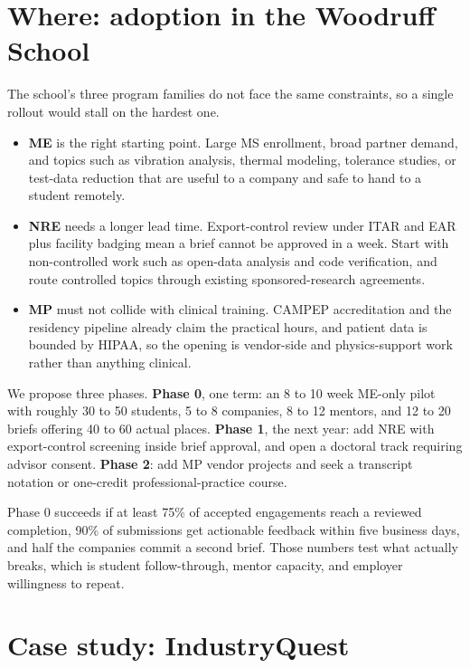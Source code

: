\documentclass[10pt,letterpaper]{article}
\begin{document}
\section{Where: adoption in the Woodruff School}

The school's three program families do not face the same constraints, so a single rollout would stall
on the hardest one.

\begin{itemize}
  \item \textbf{ME} is the right starting point. Large MS enrollment, broad partner demand, and topics
        such as vibration analysis, thermal modeling, tolerance studies, or test-data reduction that are
        useful to a company and safe to hand to a student remotely.
  \item \textbf{NRE} needs a longer lead time. Export-control review under ITAR and EAR plus facility
        badging mean a brief cannot be approved in a week. Start with non-controlled work such as
        open-data analysis and code verification, and route controlled topics through existing
        sponsored-research agreements.
  \item \textbf{MP} must not collide with clinical training. CAMPEP accreditation and the residency
        pipeline already claim the practical hours, and patient data is bounded by HIPAA, so the opening
        is vendor-side and physics-support work rather than anything clinical.
\end{itemize}

We propose three phases. \textbf{Phase 0}, one term: an 8 to 10 week ME-only pilot with roughly 30 to
50 students, 5 to 8 companies, 8 to 12 mentors, and 12 to 20 briefs offering 40 to 60 actual places.
\textbf{Phase 1}, the next year: add NRE with export-control screening inside brief approval, and open
a doctoral track requiring advisor consent. \textbf{Phase 2}: add MP vendor projects and seek a
transcript notation or one-credit professional-practice course.

Phase 0 succeeds if at least 75\% of accepted engagements reach a reviewed completion, 90\% of
submissions get actionable feedback within five business days, and half the companies commit a second
brief. Those numbers test what actually breaks, which is student follow-through, mentor capacity, and
employer willingness to repeat.

\section{Case study: IndustryQuest}
\end{document}
